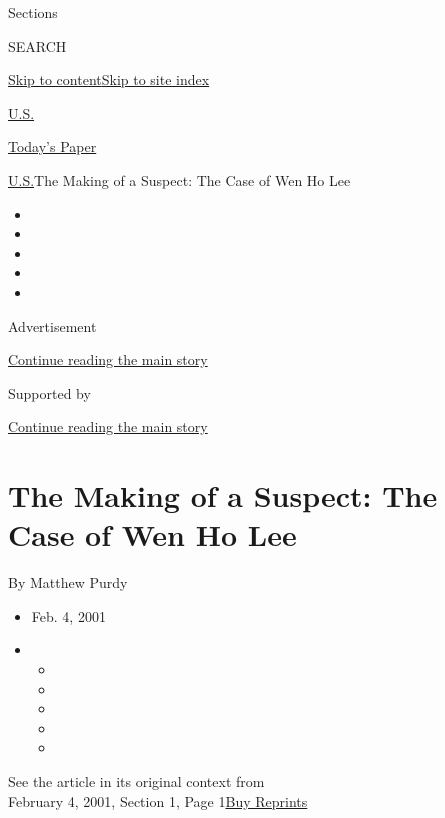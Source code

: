Sections

SEARCH

\protect\hyperlink{site-content}{Skip to
content}\protect\hyperlink{site-index}{Skip to site index}

\href{https://www.nytimes.com/section/us}{U.S.}

\href{https://myaccount.nytimes.com/auth/login?response_type=cookie\&client_id=vi}{}

\href{https://www.nytimes.com/section/todayspaper}{Today's Paper}

\href{/section/us}{U.S.}\textbar{}The Making of a Suspect: The Case of
Wen Ho Lee

\begin{itemize}
\item
\item
\item
\item
\item
\end{itemize}

Advertisement

\protect\hyperlink{after-top}{Continue reading the main story}

Supported by

\protect\hyperlink{after-sponsor}{Continue reading the main story}

\hypertarget{the-making-of-a-suspect-the-case-of-wen-ho-lee}{%
\section{The Making of a Suspect: The Case of Wen Ho
Lee}\label{the-making-of-a-suspect-the-case-of-wen-ho-lee}}

By Matthew Purdy

\begin{itemize}
\item
  Feb. 4, 2001
\item
  \begin{itemize}
  \item
  \item
  \item
  \item
  \item
  \end{itemize}
\end{itemize}

See the article in its original context from\\
February 4, 2001, Section 1, Page
1\href{https://store.nytimes.com/collections/new-york-times-page-reprints?utm_source=nytimes\&utm_medium=article-page\&utm_campaign=reprints}{Buy
Reprints}

